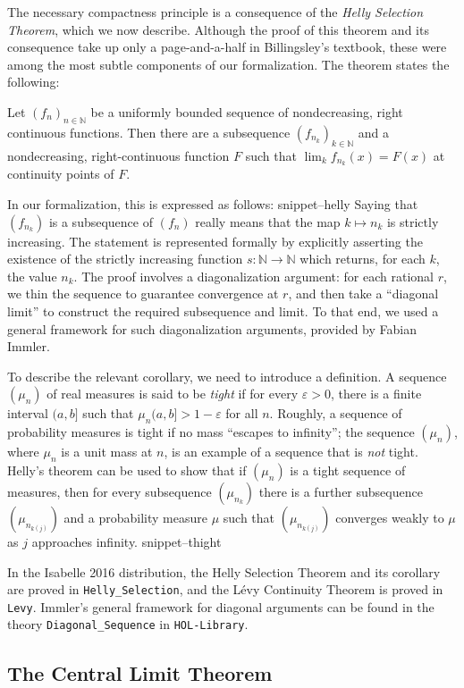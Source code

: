 \documentclass{svjour3}
\newcommand{\NN}{\mathbb{N}}
\newcommand{\Snippet}[1]{\csname snippet--#1\endcsname}
\begin{document}
The necessary compactness principle is a consequence of the \emph{Helly Selection Theorem}, which we now describe. Although the proof of this theorem and its consequence take up only a page-and-a-half in Billingsley's textbook, these were among the most subtle components of our formalization. The theorem states the following:
\begin{theorem}
Let $(f_n)_{n \in \NN}$ be a uniformly bounded sequence of nondecreasing, right continuous functions. Then there are a subsequence $(f_{n_k})_{k \in \NN}$ and a nondecreasing, right-continuous function $F$ such that $\lim_k f_{n_k}(x) = F(x)$ at continuity points of $F$.
\end{theorem}
In our formalization, this is expressed as follows:
\Snippet{helly}
Saying that $(f_{n_k})$ is a subsequence of $(f_n)$ really means that the map $k \mapsto n_k$ is strictly increasing. The statement is represented formally by explicitly asserting the existence of the strictly increasing function $s : \NN \to \NN$ which returns, for each $k$, the value $n_k$. The proof involves a diagonalization argument: for each rational $r$, we thin the sequence to guarantee convergence at $r$, and then take a ``diagonal limit'' to construct the required subsequence and limit. To that end, we used a general framework for such diagonalization arguments, provided by Fabian Immler.

To describe the relevant corollary, we need to introduce a definition. A sequence $(\mu_n)$ of real measures is said to be \emph{tight} if for every $\varepsilon > 0$, there is a finite interval $(a, b]$ such that $\mu_n(a, b] > 1 - \varepsilon$ for all $n$. Roughly, a sequence of probability measures is tight if no mass ``escapes to infinity''; the sequence $(\mu_n)$, where $\mu_n$ is a unit mass at $n$, is an example of a sequence that is \emph{not} tight. Helly's theorem can be used to show that if $(\mu_n)$ is a tight sequence of measures, then for every subsequence $(\mu_{n_k})$ there is a further subsequence $(\mu_{n_{k(j)}})$ and a probability measure $\mu$ such that $(\mu_{n_{k(j)}})$ converges weakly to $\mu$ as $j$ approaches infinity.
\Snippet{thight}

In the Isabelle 2016 distribution, the Helly Selection Theorem and its corollary are proved in \texttt{Helly\_Selection}, and the L\'evy Continuity Theorem is proved in \texttt{Levy}. Immler's general framework for diagonal arguments can be found in the theory \texttt{Diagonal\_Sequence} in \texttt{HOL-Library}.

\subsection{The Central Limit Theorem}
\end{document}
